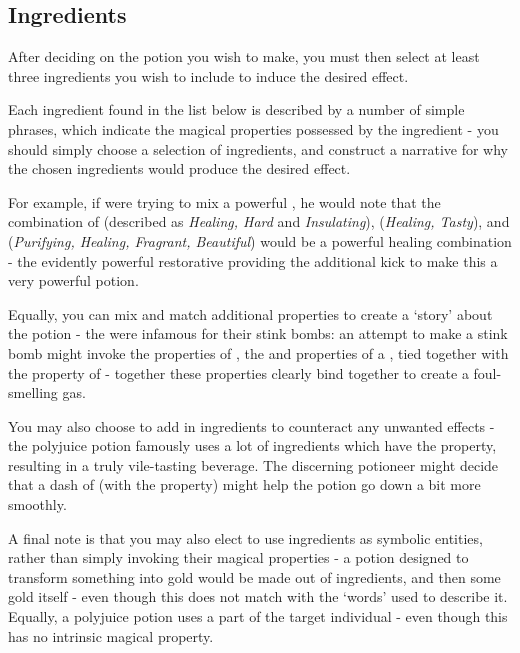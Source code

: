\subsection{Ingredients}

After deciding on the potion you wish to make, you must then select at least three ingredients you wish to include to induce the desired effect. 

Each ingredient found in the list below is described by a number of simple phrases, which indicate the magical properties possessed by the ingredient - you should simply choose a selection of ingredients, and construct a narrative for why the chosen ingredients would produce the desired effect. 

For example, if  were trying to mix a powerful , he would note that the combination of  (described as {\it Healing, Hard} and {\it Insulating}),  ({\it Healing, Tasty}), and  ({\it Purifying, Healing, Fragrant, Beautiful}) would be a powerful healing combination - the evidently powerful restorative  providing the additional kick to make this a very powerful potion.  

Equally, you can mix and match additional properties to create a `story' about the potion - the  were infamous for their stink bombs: an attempt to make a stink bomb might invoke the  properties of , the  and  properties of a , tied together with the  property of  - together these properties clearly bind together to create a foul-smelling gas. 

You may also choose to add in ingredients to counteract any unwanted effects - the polyjuice potion famously uses a lot of ingredients which have the  property, resulting in a truly vile-tasting beverage. The discerning potioneer might decide that a dash of  (with the  property) might help the potion go down a bit more smoothly. 

A final note is that you may also elect to use ingredients as symbolic entities, rather than simply invoking their magical properties - a potion designed to transform something into gold would be made out of  ingredients, and then some gold itself - even though this does not match with the `words' used to describe it. Equally, a polyjuice potion uses a part of the target individual - even though this has no intrinsic magical property. 

